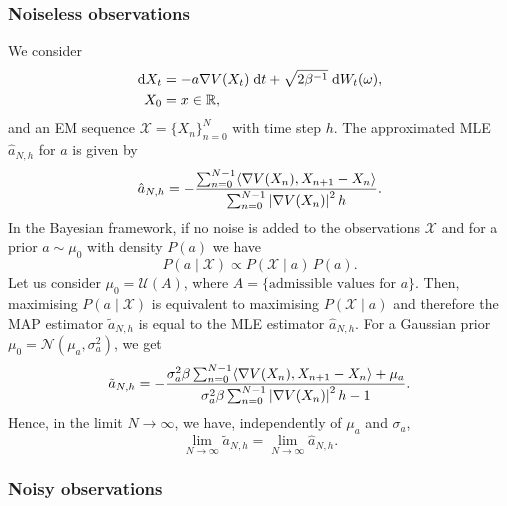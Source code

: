 \documentclass[10pt]{article}
\begin{document}
\subsubsection*{Noiseless observations}

We consider
\begin{equation}\label{eq:Langevin}
\begin{aligned}
\mathrm{d} X_t &= -a \nabla V(X_t) \; \mathrm{d} t + \sqrt{2\beta^{-1}} \; \mathrm{d} W_t(\omega),\\
X_0 &= x \in \mathbb{R},
\end{aligned}
\end{equation}
and an EM sequence $\mathcal X = \{X_n\}_{n=0}^N$ with time step $h$. The approximated MLE $\hat a_{N, h}$ for $a$ is given by
\begin{equation}
\hat a_{N, h} = - \frac{\sum_{n=0}^{N-1} \langle \nabla V(X_n), X_{n+1} - X_n\rangle}{\sum_{n=0}^{N-1} \left\lvert\nabla V(X_n)\right\rvert^2 h}.
\end{equation}
In the Bayesian framework, if no noise is added to the observations $\mathcal X$ and for a prior $a \sim \mu_0$ with density $P(a)$ we have
\begin{equation}
P(a \mid \mathcal X) \propto P(\mathcal X \mid a) \, P(a).
\end{equation}
Let us consider $\mu_0 = \mathcal U(A)$, where $A = \{\text{admissible values for } a \}$. Then, maximising $P(a \mid \mathcal X)$ is equivalent to maximising $P(\mathcal X \mid a)$ and therefore the MAP estimator $\tilde a_{N, h}$ is equal to the MLE estimator $\hat a_{N, h}$. For a Gaussian prior $\mu_0 = \mathcal N(\mu_a, \sigma^2_a)$, we get
\begin{equation}
\tilde a_{N, h} = - \frac{ \sigma_a^2 \beta\sum_{n=0}^{N-1} \langle \nabla V(X_n), X_{n+1} - X_n\rangle + \mu_a}{\sigma_a^2 \beta \sum_{n=0}^{N-1} \left\lvert\nabla V(X_n)\right\rvert^2 h - 1}.
\end{equation}
Hence, in the limit $N \to \infty$, we have, independently of $\mu_a$ and $\sigma_a$,
\begin{equation}
\lim_{N\to \infty} \tilde a_{N, h} = \lim_{N\to \infty} \hat a_{N, h}.
\end{equation}

\subsubsection*{Noisy observations}
\end{document}
